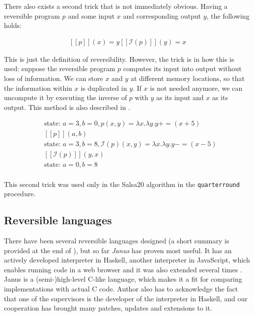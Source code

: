 \documentclass[a4paper,10pt,openright]{memoir}
\newcommand{\inv}[1]{\ensuremath{\mathcal{I}(#1)}}
\newcommand{\exe}[1]{\ensuremath{[\![#1]\!]}}
\newcommand{\term}[1]{\textit{#1}}
\newcommand{\code}[1]{\texttt{#1}}
\begin{document}
There also exists a second trick that is not immediately obvious. Having 
a reversible program $p$ and some input $x$ and corresponding output $y$, the 
following holds:

\begin{align*}
\exe{p}(x) = y
\exe{\inv{p}}(y) = x
\end{align*}

This is just the definition of reversibility. However, the trick is in 
how this is used: suppose the reversible program $p$ computes its input 
into output without loss of information. We can store $x$ and $y$ at 
different memory locations, so that the information within $x$ is 
duplicated in $y$. If $x$ is not needed anymore, we can uncompute it by 
executing the inverse of $p$ with $y$ as its input and $x$ as its 
output. This method is also described in \cite{Bennett73}.

\begin{align*}
&\text{state: } a = 3, b = 0, p(x,y) = \lambda x. \lambda y. y += (x + 5)\\
&\exe{p}(a,b)\\
&\text{state: } a = 3, b = 8, \inv{p}(x,y) = \lambda x. \lambda y. y -= (x - 5)\\
&\exe{\inv{p}}(y,x)\\
&\text{state: } a = 0, b = 8\\
\end{align*}


This second trick was used only in the Salsa20 algorithm in the 
\code{quarterround} procedure. 

\subsection{Reversible languages}

There have been several reversible languages designed (a short summary 
is provided at the end of \cite{Yokoyama2010}), but so far \term{Janus} 
has proven most useful. It has an actively developed interpreter in 
Haskell, another interpreter in JavaScript, which enables running code 
in a web browser and it was also extended several times 
\cite{janus-topps}. Janus is a (semi-)high-level C-like language, which 
makes it a fit for comparing implementations with actual C code. Author 
also has to acknowledge the fact that one of the supervisors is the 
developer of the interpreter in Haskell, and our cooperation has 
brought many patches, updates and extensions to it.
\end{document}
